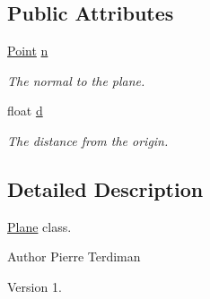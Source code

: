 \subsection*{Public Attributes}
\begin{DoxyCompactItemize}
\item 
\hypertarget{class_plane_af400cfb3367fc032b4223a587d605035}{\hyperlink{class_point}{Point} \hyperlink{class_plane_af400cfb3367fc032b4223a587d605035}{n}}\label{class_plane_af400cfb3367fc032b4223a587d605035}

\begin{DoxyCompactList}\small\item\em The normal to the plane. \end{DoxyCompactList}\item 
\hypertarget{class_plane_a61fc789fce8fbe72914f5397f1bbed44}{float \hyperlink{class_plane_a61fc789fce8fbe72914f5397f1bbed44}{d}}\label{class_plane_a61fc789fce8fbe72914f5397f1bbed44}

\begin{DoxyCompactList}\small\item\em The distance from the origin. \end{DoxyCompactList}\end{DoxyCompactItemize}


\subsection{Detailed Description}
\hyperlink{class_plane}{Plane} class.

\begin{DoxyAuthor}{Author}
Pierre Terdiman 
\end{DoxyAuthor}
\begin{DoxyVersion}{Version}
1. 
\end{DoxyVersion}


